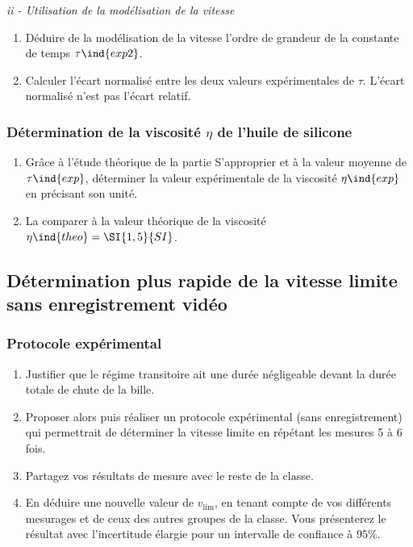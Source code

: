 \documentclass[a4paper, 11pt, final, garamond]{book}
\begin{document}
\bigbreak

\textit{ii - Utilisation de la modélisation de la vitesse} \bigbreak

\begin{enumerate}[label=\sqenumi, resume]
    \item Déduire de la modélisation de la vitesse l'ordre de grandeur de la
        constante de temps $\tau\ind{exp2}$.
    \item Calculer l'écart normalisé entre les deux valeurs expérimentales de
        $\tau$. L'écart normalisé n'est pas l'écart relatif.
\end{enumerate}
 
\subsubsection{Détermination de la viscosité $\eta$ de l'huile de silicone}

\begin{enumerate}[label=\sqenumi, resume]
    \item Grâce à l'étude théorique de la partie S'approprier et à la valeur
        moyenne de $\tau\ind{exp}$, déterminer la valeur expérimentale de la
        viscosité $\eta\ind{exp}$ en précisant son unité.
    \item La comparer à la valeur théorique de la viscosité $\eta\ind{theo} =
        \SI{1,5}{SI}$.
\end{enumerate}
 
\subsection{Détermination plus rapide de la vitesse limite sans enregistrement vidéo}
\subsubsection{Protocole expérimental}

\begin{enumerate}[label=\sqenumi, resume]
    \item Justifier que le régime transitoire ait une durée négligeable devant
        la durée totale de chute de la bille.
    \item Proposer alors puis réaliser un protocole expérimental (sans
        enregistrement) qui permettrait de déterminer la vitesse limite en
        répétant les mesures 5 à 6 fois.
    \item Partagez vos résultats de mesure avec le reste de la classe.
    \item En déduire une nouvelle valeur de $v_{\lim}$, en tenant compte de vos
        différents mesurages et de ceux des autres groupes de la classe. Vous
        présenterez le résultat avec l'incertitude élargie pour un intervalle de
        confiance à $95 \%$.
\end{enumerate}
\end{document}
